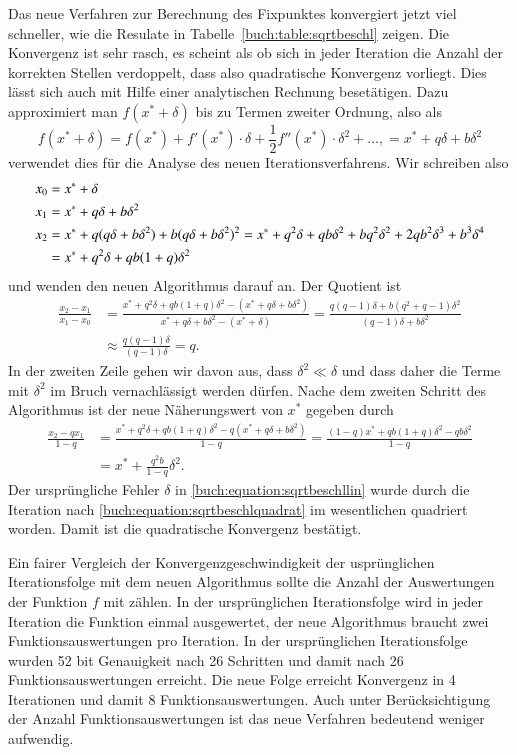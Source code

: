 Das neue Verfahren zur Berechnung des Fixpunktes konvergiert jetzt
viel schneller, wie die Resulate in Tabelle~\ref{buch:table:sqrtbeschl}
zeigen.
Die Konvergenz ist sehr rasch, es scheint als ob sich in jeder
Iteration die Anzahl der korrekten Stellen verdoppelt, dass also
quadratische Konvergenz vorliegt.
Dies lässt sich auch mit Hilfe einer analytischen Rechnung
besetätigen.
Dazu approximiert man $f(x^*+\delta)$ bis zu Termen zweiter Ordnung,
also als
\[
f(x^*+\delta)
=
f(x^*) + f'(x^*)\cdot \delta + \frac12f''(x^*)\cdot \delta^2+ \dots,
=
x^* + q\delta + b\delta^2
\]
verwendet dies für die Analyse des neuen Iterationsverfahrens.
Wir schreiben also
\begin{align}
x_0
&=
x^* + \delta
\label{buch:equation:sqrtbeschllin}
\\
x_1
&=
x^* + q\delta + b\delta^2
\notag
\\
x_2
&=
x^* + q(q\delta+b\delta^2) + b(q\delta+b\delta^2)^2
     = x^* + q^2 \delta + qb\delta^2 + bq^2\delta^2
	+ 2qb^2\delta^3 + b^3\delta^4
\notag
\\
&=
x^* + q^2\delta + qb(1+q)\delta^2
\notag
\end{align}
und wenden den neuen Algorithmus darauf an.
Der Quotient ist
\begin{align*}
\frac{x_2-x_1}{x_1-x_0}
&=
\frac{x^* + q^2\delta + qb(1+q)\delta^2 - 
(x^* + q\delta + b\delta^2)}{
x^* + q\delta + b\delta^2
-
(x^* + \delta)
}
=
\frac{
q(q-1)\delta + b(q^2+q -1) \delta^2
}{
(q-1)\delta + b\delta^2
}
\\
&\approx
\frac{q(q-1)\delta}{(q-1)\delta}
=
q.
\end{align*}
In der zweiten Zeile gehen wir davon aus, dass $\delta^2 \ll \delta$ und
dass daher die Terme mit $\delta^2$ im Bruch vernachlässigt werden dürfen.
Nache dem zweiten Schritt des Algorithmus ist der neue Näherungswert
von $x^*$ gegeben durch
\begin{align}
\frac{x_2-qx_1}{1-q}
&=
\frac{
x^* + q^2\delta + qb(1+q)\delta^2
-q(
x^* + q\delta + b\delta^2
)
}{
1-q
}
=
\frac{ (1-q)x^* + qb(1+q)\delta^2 - qb\delta^2 }{1-q}
\label{buch:equation:sqrtnext}
\\
&=
x^* + \frac{q^2b}{1-q}\delta^2.
\label{buch:equation:sqrtbeschlquadrat}
\end{align}
Der ursprüngliche Fehler $\delta$ in 
\eqref{buch:equation:sqrtbeschllin}
wurde
durch die Iteration
nach
\eqref{buch:equation:sqrtbeschlquadrat}
im wesentlichen quadriert worden.
Damit ist die quadratische Konvergenz bestätigt.

Ein fairer Vergleich der Konvergenzgeschwindigkeit der usprünglichen
Iterationsfolge mit dem neuen Algorithmus sollte die Anzahl der
Auswertungen der Funktion $f$ mit zählen. 
In der ursprünglichen Iterationsfolge wird in jeder Iteration die 
Funktion einmal ausgewertet, der neue Algorithmus braucht zwei
Funktionsauswertungen pro Iteration.
In der ursprünglichen Iterationsfolge wurden 52 bit Genauigkeit nach
26 Schritten und damit nach 26 Funktionsauswertungen erreicht.
Die neue Folge erreicht Konvergenz in 4 Iterationen und damit 8
Funktionsauswertungen.
Auch unter Berücksichtigung der Anzahl Funktionsauswertungen ist
das neue Verfahren bedeutend weniger aufwendig.

